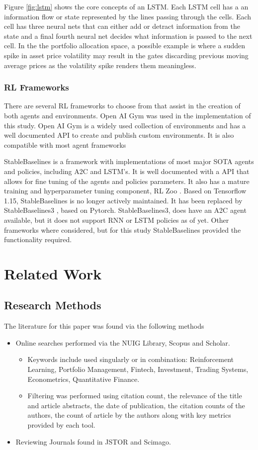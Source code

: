 \documentclass[oneside,12pt]{Classes/RoboticsLaTeX}
\begin{document}
Figure \ref{fig:lstm} \citep{45500} shows the core concepts of an LSTM. Each LSTM cell has a an information flow or state represented by the lines passing through the cells.  Each cell has three neural nets that can either add or detract information from the state and a final fourth neural net decides what information is passed to the next cell. In the the portfolio allocation space, a possible example is where a sudden spike in asset price volatility may result in the gates discarding previous moving average prices as the volatility spike renders them meaningless.

\subsection{RL Frameworks}
There are several RL frameworks to choose from that assist in the creation of both agents and environments.  Open AI Gym \citep{1606.01540} was used in the implementation of this study. Open AI Gym is a widely used collection of environments and has a well documented API to create and publish custom environments. It is also compatible with most agent frameworks

StableBaselines \citep{stable-baselines} is a framework with implementations of most major SOTA agents and policies, including A2C and LSTM's. It is well documented with a API that allows for fine tuning of the agents and policies parameters. It also has a mature training and hyperparameter tuning component, RL Zoo \citep{rl-zoo}. Based on Tensorflow 1.15, StableBaselines is no longer actively maintained. It has been replaced by StableBaselines3 \citep{stable-baselines3}, based on Pytorch.  StableBaselines3, does have an A2C agent available, but it does not support RNN or LSTM policies as of yet. Other frameworks where considered, but for this study StableBaselines provided the functionality required.

\chapter{Related Work}
\label{chap:rel_work}
\section{Research Methods}
The literature for this paper was found via the following methods
\begin{itemize}
\item Online searches performed via the NUIG Library, Scopus and Scholar.
    \begin{itemize}
    \item Keywords include used singularly or in combination: Reinforcement Learning, Portfolio Management, Fintech, Investment, Trading Systems, Econometrics, Quantitative Finance.
    \item Filtering was performed using citation count, the relevance of the title and article abstracts, the date of publication, the citation counts of the authors, the count of article by the authors along with key metrics provided by each tool.
    \end{itemize}
\item Reviewing Journals found in JSTOR and Scimago.
\end{itemize}
\end{document}
